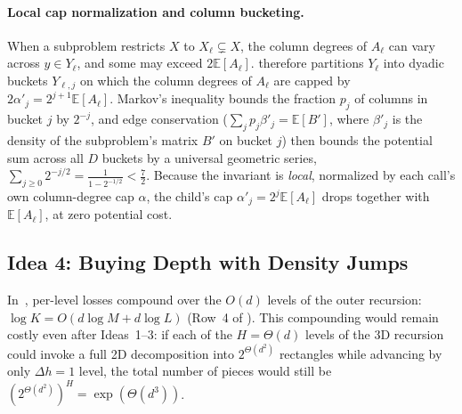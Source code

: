 \documentclass[11pt]{article}
\theoremstyle{definition}
\renewcommand{\label}[1]{}%
\newcommand{\E}{\mathbb{E}}
\newcommand{\dens}[1]{\E[#1]}
\begin{document}
\paragraph{Local cap normalization and column bucketing.}
When a subproblem restricts $X$ to $X_\ell \subsetneq X$, the column degrees of $A_\ell$ can vary across $y \in Y_\ell$, and some may exceed $2\dens{A_\ell}$.  therefore partitions $Y_\ell$ into dyadic buckets $Y_{\ell, j}$ on which the column degrees of $A_\ell$ are capped by $2\alpha'_j = 2^{j+1}\dens{A_\ell}$. Markov's inequality bounds the fraction $p_j$ of columns in bucket $j$ by $2^{-j}$, and edge conservation ($\sum_j p_j\beta'_j = \dens{B'}$, where $\beta'_j$ is the density of the subproblem's matrix $B'$ on bucket $j$) then bounds the potential sum across all $D$ buckets by a universal geometric series, $\sum_{j \ge 0} 2^{-j/2} = \frac{1}{1 - 2^{-1/2}} < \frac{7}{2}$. Because the invariant is \emph{local}, normalized by each call's own column-degree cap $\alpha$, the child's cap $\alpha'_j = 2^j\dens{A_\ell}$ drops together with $\dens{A_\ell}$, at zero potential cost.

\subsection{Idea 4: Buying Depth with Density Jumps}
\label{sec:overview-depth}

In~\cite{AFKLM24}, per-level losses compound over the $O(d)$ levels of the outer recursion: $\log K = O(d\log M + d\log L)$ (Row~4 of ). This compounding would remain costly even after Ideas~1--3: if each of the $H = \Theta(d)$ levels of the 3D recursion could invoke a full 2D decomposition into $2^{\Theta(d^2)}$ rectangles while advancing by only $\Delta h = 1$ level, the total number of pieces would still be $(2^{\Theta(d^2)})^H = \exp(\Theta(d^3))$.
\end{document}
